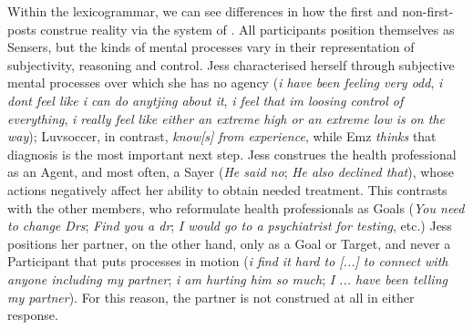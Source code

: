 Within the \gls{lexicogrammar}, we can see differences in how the first and non\hyp{}first\hyp{}\glspl{post} construe reality via the system of . All participants position themselves as Sensers, but the kinds of mental processes vary in their representation of subjectivity, reasoning and control. Jess characterised herself through subjective mental processes over which she has no agency (\emph{i have been feeling very odd}, \emph{i dont feel like i  can do anytjing about it}, \emph{i feel that im loosing control of everything}, \emph{i really feel like either an extreme high or an extreme low is on the way}); Luvsoccer, in contrast, \emph{know[s] from experience}, while Emz \emph{thinks} that diagnosis is the most important next step. Jess construes the health professional as an Agent, and most often, a Sayer (\emph{He said no}; \emph{He also declined that}), whose actions negatively affect her ability to obtain needed treatment. This contrasts with the other members, who reformulate health professionals as Goals (\emph{You need to change Drs}; \emph{Find you a dr}; \emph{I would go to a psychiatrist for testing}, etc.) Jess positions her partner, on the other hand, only as a Goal or Target, and never a Participant that puts processes in motion (\emph{i find it hard to [...] to connect with anyone including my partner}; \emph{i am hurting him so much}; \emph{I ... have been telling my partner}). For this reason, the partner is not construed at all in either response.


